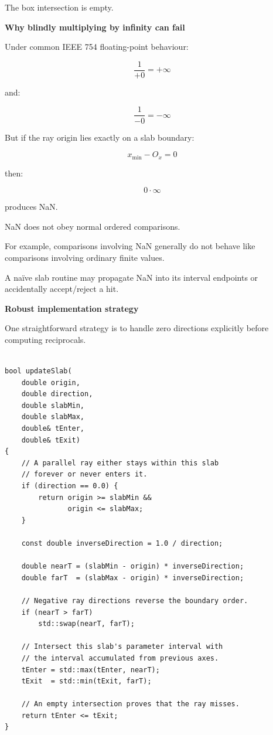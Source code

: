 The box intersection is empty.

\textbf{Why blindly multiplying by infinity can fail}

Under common IEEE 754 floating-point behaviour:

\[
\frac1{+0}=+\infty
\]

and:

\[
\frac1{-0}=-\infty
\]

But if the ray origin lies exactly on a slab boundary:

\[
x_{\min}-O_x=0
\]

then:

\[
0\cdot\infty
\]

produces NaN.

NaN does not obey normal ordered comparisons.

For example, comparisons involving NaN generally do not behave like comparisons involving ordinary finite values.

A naïve slab routine may propagate NaN into its interval endpoints or accidentally accept/reject a hit.

\textbf{Robust implementation strategy}

One straightforward strategy is to handle zero directions explicitly before computing reciprocals.

\begin{verbatim}

bool updateSlab(
    double origin,
    double direction,
    double slabMin,
    double slabMax,
    double& tEnter,
    double& tExit)
{
    // A parallel ray either stays within this slab
    // forever or never enters it.
    if (direction == 0.0) {
        return origin >= slabMin &&
               origin <= slabMax;
    }

    const double inverseDirection = 1.0 / direction;

    double nearT = (slabMin - origin) * inverseDirection;
    double farT  = (slabMax - origin) * inverseDirection;

    // Negative ray directions reverse the boundary order.
    if (nearT > farT)
        std::swap(nearT, farT);

    // Intersect this slab's parameter interval with
    // the interval accumulated from previous axes.
    tEnter = std::max(tEnter, nearT);
    tExit  = std::min(tExit, farT);

    // An empty intersection proves that the ray misses.
    return tEnter <= tExit;
}
\end{verbatim}


